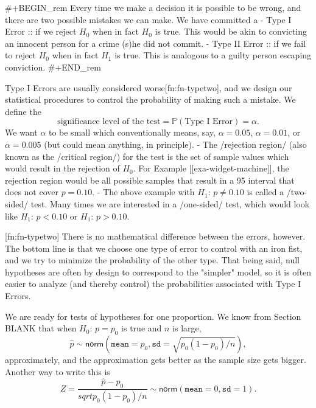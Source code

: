 #+BEGIN_rem
Every time we make a decision it is possible to be wrong, and there
are two possible mistakes we can make. We have committed a
- Type I Error :: if we reject \(H_{0}\) when in fact \(H_{0}\) is
                  true. This would be akin to convicting an innocent
                  person for a crime (s)he did not commit.
- Type II Error :: if we fail to reject \(H_{0}\) when in fact
                   \(H_{1}\) is true. This is analogous to a guilty
                   person escaping conviction.
#+END_rem

Type I Errors are usually considered worse[fn:fn-typetwo], and we
design our statistical procedures to control the probability of making
such a mistake. We define the
\begin{equation}
\mbox{significance level of the test} = \mathbb{P}(\mbox{Type I Error}) = \alpha.
\end{equation}
We want \(\alpha\) to be small which conventionally means, say,
\(\alpha=0.05\), \(\alpha=0.01\), or \(\alpha=0.005\) (but could mean
anything, in principle).
- The /rejection region/ (also known as the /critical region/) for the
  test is the set of sample values which would result in the rejection
  of \(H_{0}\). For Example [[exa-widget-machine]], the rejection region
  would be all possible samples that result in a 95%
  interval that does not cover \(p = 0.10\).
- The above example with \(H_{1}:\,p \neq 0.10\) is called a
  /two-sided/ test. Many times we are interested in a /one-sided/
  test, which would look like \(H_{1}:\,p < 0.10\) or \(H_{1}:\,p >
  0.10\).

[fn:fn-typetwo] There is no mathematical difference between the
errors, however. The bottom line is that we choose one type of error
to control with an iron fist, and we try to minimize the probability
of the other type. That being said, null hypotheses are often by
design to correspond to the "simpler" model, so it is often easier to
analyze (and thereby control) the probabilities associated with Type I
Errors.

We are ready for tests of hypotheses for one proportion.  We know from
Section BLANK that when \(H_{0}:\,p = p_{0}\) is true and \(n\) is
large,
\begin{equation}
\hat{p} \sim \mathsf{norm}(\mathtt{mean} = p_{0}, \mathtt{sd} = \sqrt{p_{0}(1 - p_{0})/n}),
\end{equation}
approximately, and the approximation gets better as the sample size gets bigger. Another way to write this is 
\begin{equation}
Z = \frac{\hat{p} - p_{0}}{sqrt{p_{0}(1 - p_{0})/n}}  \sim \mathsf{norm}(\mathtt{mean} = 0, \mathtt{sd} = 1).
\end{equation}

